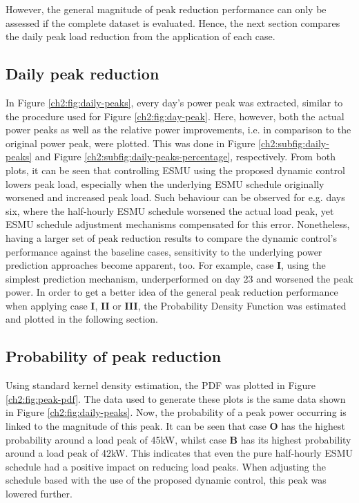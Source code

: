 

However, the general magnitude of peak reduction performance can only be assessed if the complete dataset is evaluated.
Hence, the next section compares the daily peak load reduction from the application of each case.

\subsection{Daily peak reduction}



In Figure \ref{ch2:fig:daily-peaks}, every day's power peak was extracted, similar to the procedure used for Figure \ref{ch2:fig:day-peak}.
Here, however, both the actual power peaks as well as the relative power improvements, i.e. in comparison to the original power peak, were plotted.
This was done in Figure \ref{ch2:subfig:daily-peaks} and Figure \ref{ch2:subfig:daily-peaks-percentage}, respectively.
From both plots, it can be seen that controlling ESMU using the proposed dynamic control lowers peak load, especially when the underlying ESMU schedule originally worsened and increased peak load.
Such behaviour can be observed for e.g. days six, where the half-hourly ESMU schedule worsened the actual load peak, yet ESMU schedule adjustment mechanisms compensated for this error.
Nonetheless, having a larger set of peak reduction results to compare the dynamic control's performance against the baseline cases, sensitivity to the underlying power prediction approaches become apparent, too.
For example, case \textbf{I}, using the simplest prediction mechanism, underperformed on day 23 and worsened the peak power.
In order to get a better idea of the general peak reduction performance when applying case \textbf{I}, \textbf{II} or \textbf{III}, the Probability Density Function was estimated and plotted in the following section.

\subsection{Probability of peak reduction}
\label{ch2:subsec:probability-of-peak-reduction}



Using standard kernel density estimation, the PDF was plotted in Figure \ref{ch2:fig:peak-pdf}.
The data used to generate these plots is the same data shown in Figure \ref{ch2:fig:daily-peaks}.
Now, the probability of a peak power occurring is linked to the magnitude of this peak.
It can be seen that case \textbf{O} has the highest probability around a load peak of 45kW, whilst case \textbf{B} has its highest probability around a load peak of 42kW.
This indicates that even the pure half-hourly ESMU schedule had a positive impact on reducing load peaks.
When adjusting the schedule based with the use of the proposed dynamic control, this peak was lowered further.

